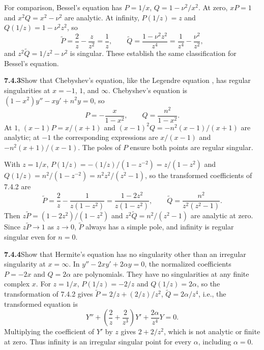 For comparison, Bessel's equation has $P=1/x$, $Q=1-\nu^2/x^2$.
At zero, $xP=1$ and $x^2Q=x^2-\nu^2$ are analytic. At infinity,
$P(1/z)=z$ and $Q(1/z)=1-\nu^2z^2$, so
\[
\widetilde P=\frac2z-\frac z{z^2}=\frac1z,\qquad
\widetilde Q=\frac{1-\nu^2z^2}{z^4}=\frac1{z^4}-\frac{\nu^2}{z^2},
\]
and $z^2\widetilde Q=1/z^2-\nu^2$ is singular. These establish the
same classification for Bessel's equation.

\par\bigskip
\noindent\textbf{7.4.3}\quad Show that Chebyshev's equation, like the Legendre
equation , has regular singularities at $x=-1$, $1$, and $\infty$.
\solution
Chebyshev's equation is $(1-x^2)y''-xy'+n^2y=0$, so
\[
P=-\frac{x}{1-x^2},\qquad Q=\frac{n^2}{1-x^2}.
\]
At $1$, $(x-1)P=x/(x+1)$ and
$(x-1)^2Q=-n^2(x-1)/(x+1)$ are analytic; at $-1$ the corresponding
expressions are $x/(x-1)$ and $-n^2(x+1)/(x-1)$.
The poles of $P$ ensure both points are regular singular.

With $z=1/x$,
$P(1/z)=-(1/z)/(1-z^{-2})=z/(1-z^2)$ and
$Q(1/z)=n^2/(1-z^{-2})=n^2z^2/(z^2-1)$, so the transformed coefficients
of 7.4.2 are
\[
\widetilde P=\frac2z-\frac1{z(1-z^2)}
=\frac{1-2z^2}{z(1-z^2)},\qquad
\widetilde Q=\frac{n^2}{z^2(z^2-1)}.
\]
Then $z\widetilde P=(1-2z^2)/(1-z^2)$ and
$z^2\widetilde Q=n^2/(z^2-1)$ are analytic at zero.
Since $z\widetilde P\to1$ as $z\to0$, $\widetilde P$ always has a simple
pole, and infinity is regular singular even for $n=0$.

\par\bigskip
\noindent\textbf{7.4.4}\quad Show that Hermite's equation has no singularity
other than an irregular singularity at $x=\infty$.
\solution
In $y''-2xy'+2\alpha y=0$, the normalized coefficients
$P=-2x$ and $Q=2\alpha$ are polynomials. They have no singularities at
any finite complex $x$.
For $z=1/x$, $P(1/z)=-2/z$ and $Q(1/z)=2\alpha$, so the transformation
of 7.4.2 gives $\widetilde P=2/z+(2/z)/z^2$, $\widetilde Q=2\alpha/z^4$,
i.e., the transformed equation is
\[
Y''+\left(\frac2z+\frac2{z^3}\right)Y'
       +\frac{2\alpha}{z^4}Y=0.
\]
Multiplying the coefficient of $Y'$ by $z$ gives $2+2/z^2$, which
is not analytic or finite at zero. Thus infinity is an irregular singular
point for every $\alpha$, including $\alpha=0$.

